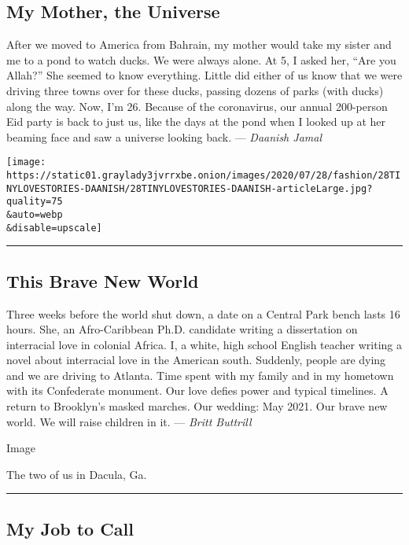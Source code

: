 \hypertarget{my-mother-the-universe}{%
\subsection{My Mother, the Universe}\label{my-mother-the-universe}}

After we moved to America from Bahrain, my mother would take my sister
and me to a pond to watch ducks. We were always alone. At 5, I asked
her, ``Are you Allah?'' She seemed to know everything. Little did either
of us know that we were driving three towns over for these ducks,
passing dozens of parks (with ducks) along the way. Now, I'm 26. Because
of the coronavirus, our annual 200-person Eid party is back to just us,
like the days at the pond when I looked up at her beaming face and saw a
universe looking back. --- \emph{Daanish Jamal}

\texttt{[image: https://static01.graylady3jvrrxbe.onion/images/2020/07/28/fashion/28TINYLOVESTORIES-DAANISH/28TINYLOVESTORIES-DAANISH-articleLarge.jpg?quality=75\\\&auto=webp\\\&disable=upscale]}

\begin{center}\rule{0.5\linewidth}{\linethickness}\end{center}

\hypertarget{this-brave-new-world}{%
\subsection{This Brave New World}\label{this-brave-new-world}}

Three weeks before the world shut down, a date on a Central Park bench
lasts 16 hours. She, an Afro-Caribbean Ph.D. candidate writing a
dissertation on interracial love in colonial Africa. I, a white, high
school English teacher writing a novel about interracial love in the
American south. Suddenly, people are dying and we are driving to
Atlanta. Time spent with my family and in my hometown with its
Confederate monument. Our love defies power and typical timelines. A
return to Brooklyn's masked marches. Our wedding: May 2021. Our brave
new world. We will raise children in it. --- \emph{Britt Buttrill}

Image

The two of us in Dacula, Ga.

\begin{center}\rule{0.5\linewidth}{\linethickness}\end{center}

\hypertarget{my-job-to-call}{%
\subsection{My Job to Call}\label{my-job-to-call}}

